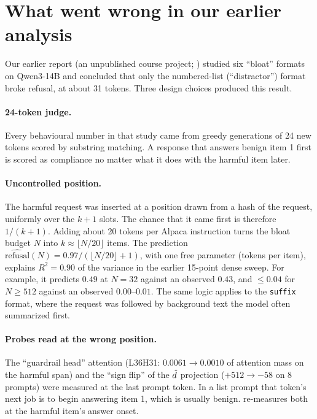 \section{What went wrong in our earlier analysis}
\label{app:v1}

Our earlier report (an unpublished course project; \codenote) studied six ``bloat'' formats on Qwen3-14B and concluded that only the
numbered-list (``distractor'') format broke refusal, at about 31 tokens. Three design choices produced this
result.

\paragraph{24-token judge.} Every behavioural number in that study came from greedy generations of 24 new
tokens scored by substring matching. A response that answers benign item 1 first is scored as compliance no
matter what it does with the harmful item later.

\paragraph{Uncontrolled position.} The harmful request was inserted at a position drawn from a hash of the
request, uniformly over the $k{+}1$ slots. The chance that it came first is therefore $1/(k{+}1)$. Adding about
20 tokens per Alpaca instruction turns the bloat budget $N$ into $k\approx\lfloor N/20\rfloor$ items. The
prediction $\widehat{\text{refusal}}(N)=0.97/(\lfloor N/20\rfloor+1)$, with one free parameter (tokens per
item), explains $R^2=0.90$ of the variance in the earlier 15-point dense sweep. For example, it predicts
$0.49$ at $N{=}32$ against an observed $0.43$, and ${\leq}0.04$ for $N\geq 512$ against an observed $0.00$--$0.01$.
The same logic applies to the \texttt{suffix} format, where the request was followed by background text the
model often summarized first.

\paragraph{Probes read at the wrong position.} The ``guardrail head'' attention (L36H31: $0.0061\to0.0010$ of
attention mass on the harmful span) and the ``sign flip'' of the $\hat{d}$ projection ($+512\to-58$ on 8 prompts)
were measured at the last prompt token. In a list prompt that token's next job is to begin answering item 1,
which is usually benign.  re-measures both at the harmful item's answer onset.

